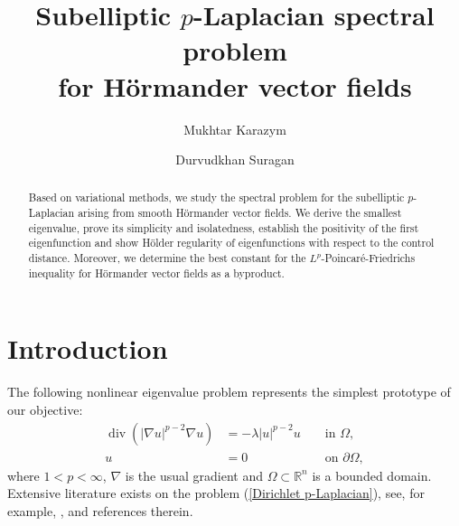 \documentclass[a4paper,12pt,reqno]{amsart}
\renewcommand\eqref[1]{(\ref{#1})} %
\numberwithin{equation}{section}
\theoremstyle{plain}
\theoremstyle{definition}
\begin{document}
   \title[Subelliptic $p$-Laplacian spectral problem  for H\"ormander vector fields]
   {Subelliptic $p$-Laplacian spectral problem \\ for H\"ormander vector fields}

\author[M. Karazym]{Mukhtar Karazym}
\address{
  Mukhtar Karazym:
  \endgraf
  Department of Mathematics
  \endgraf
Nazarbayev University, Kazakhstan
  \endgraf
  {\it E-mail address} {\rm  mukhtar.karazym@nu.edu.kz; mukhtarkarazym@gmail.com}
  }

 \author[D. Suragan]{Durvudkhan Suragan}
\address{
	Durvudkhan Suragan:
	\endgraf
	Department of Mathematics
	\endgraf
Nazarbayev University, Kazakhstan
	\endgraf
	{\it E-mail address} {\rm durvudkhan.suragan@nu.edu.kz}
} 




\begin{abstract} 
Based on variational methods, we study the spectral problem for the subelliptic $p$-Laplacian  arising from smooth H\"ormander vector fields. We derive the smallest eigenvalue, prove its simplicity and  isolatedness, establish  the positivity of the first eigenfunction and show  H\"older regularity of eigenfunctions with respect to the control distance.  Moreover, we determine the best constant for the $L^{p}$-Poincar\'e-Friedrichs inequality for H\"ormander vector fields as a byproduct.
\end{abstract}
\maketitle


\section{Introduction}
The following nonlinear eigenvalue problem represents the simplest prototype of our objective:
\begin{equation}\label{Dirichlet p-Laplacian}
\begin{aligned}
\operatorname{div}\left(|\nabla u|^{p-2} \nabla u\right)&=-\lambda|u|^{p-2} u  &&\text { in } \Omega, \\
u&=0 &&\text { on } \partial \Omega,
\end{aligned}
\end{equation}
where $1<p<\infty$, $\nabla$ is the usual gradient and $\Omega\subset\mathbb{R}^{n}$ is a bounded domain.  Extensive literature exists on the problem \eqref{Dirichlet p-Laplacian}, see, for example, \cite{Bonder2015review}, \cite{lindqvist2008nonlinear} and references therein. 
\end{document}
